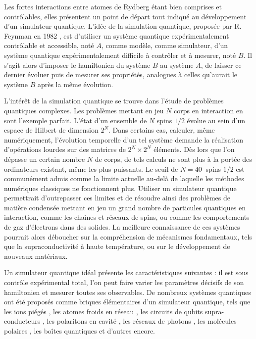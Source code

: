 \bigskip
Les fortes interactions entre atomes de Rydberg étant bien comprises et contrôlables, elles présentent un point de départ tout indiqué au développement d'un simulateur quantique.
L'idée de la simulation quantique, proposée par R. Feynman en 1982 \cite{Feynman1982}, est d'utiliser un système quantique expérimentalement contrôlable et accessible, noté $A$, comme modèle, comme simulateur, d'un système quantique expérimentalement difficile à contrôler et à mesurer, noté $B$.
Il s'agit alors d'imposer le hamiltonien du système $B$ au système $A$, de laisser ce dernier évoluer puis de mesurer ses propriétés, analogues à celles qu'aurait le système $B$ après la même évolution.

L'intérêt de la simulation quantique se trouve dans l'étude de problèmes quantiques complexes.
Les problèmes mettant en jeu $N$ corps en interaction en sont l'exemple parfait.
L'état d'un ensemble de $N$ spins $1/2$ évolue au sein d'un espace de Hilbert de dimension $2^N$.
Dans certains cas, calculer, même numériquement, l'évolution temporelle d'un tel système demande la réalisation d'opérations lourdes %
sur des matrices de $2^N \times 2^N$ éléments.
Dès lors que l'on dépasse un certain nombre $N$ de corps, de tels calculs ne sont plus à la portée des ordinateurs existant, même les plus puissants.
Le seuil de $N=\SI{40}{}$ spins $1/2$ est communément admis \cite{Cirac2003,Friedenauer2008,Lloyd1996,Raedt2007} comme la limite actuelle au-delà de laquelle les méthodes numériques classiques ne fonctionnent plus.
Utiliser un simulateur quantique permettrait d'outrepasser ces limites et de résoudre ainsi des problèmes de matière condensée mettant en jeu un grand nombre de particules quantiques en interaction, comme les chaînes et réseaux de spins, ou comme les comportements de gaz d'électrons dans des solides.
La meilleure connaissance de ces systèmes pourrait alors déboucher sur la compréhension de mécanismes fondamentaux, tels que la supraconductivité à haute température, ou sur le développement de nouveaux matériaux.

Un simulateur quantique idéal présente les caractéristiques suivantes : il est sous contrôle expérimental total, l'on peut faire varier les paramètres décisifs de son hamiltonien et mesurer toutes ses observables.
De nombreux systèmes quantiques ont été proposés comme briques élémentaires d'un simulateur quantique, tels que les ions piégés \cite{Blatt2012,Schneider2012}, les atomes froids en réseau \cite{Jaksch2005,Lewenstein2007,Bloch2012,Bloch2008}, les circuits de qubits supra-conducteurs \cite{Houck2012}, les polaritons en cavité \cite{Tanese2014}, les réseaux de photons \cite{Aspuru-Guzik2012,Carusotto2013}, les molécules polaires \cite{Buechler2009}, les boîtes  quantiques \cite{Cai2013,Manousakis2002,Byrnes2007} et d'autres encore.

